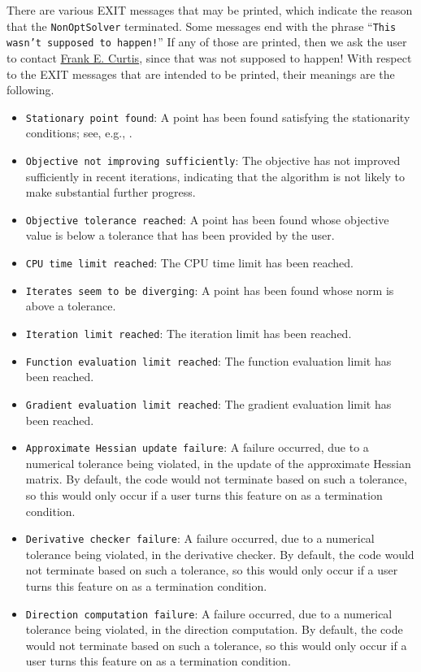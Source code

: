 \documentclass{article}
\begin{document}
There are various EXIT messages that may be printed, which indicate the reason that the \texttt{NonOptSolver} terminated.  Some messages end with the phrase ``\texttt{This wasn't supposed to happen!}''  If any of those are printed, then we ask the user to contact \href{mailto:frank.e.curtis@gmail.com}{Frank E. Curtis}, since that was not supposed to happen!  With respect to the EXIT messages that are intended to be printed, their meanings are the following.

\begin{itemize}
  \item \texttt{Stationary point found}: A point has been found satisfying the stationarity conditions; see, e.g., \cite{CurtRobiZhou20}.
  \item \texttt{Objective not improving sufficiently}: The objective has not improved sufficiently in recent iterations, indicating that the algorithm is not likely to make substantial further progress.
  \item \texttt{Objective tolerance reached}: A point has been found whose objective value is below a tolerance that has been provided by the user.
  \item \texttt{CPU time limit reached}: The CPU time limit has been reached.
  \item \texttt{Iterates seem to be diverging}: A point has been found whose norm is above a tolerance.
  \item \texttt{Iteration limit reached}: The iteration limit has been reached.
  \item \texttt{Function evaluation limit reached}: The function evaluation limit has been reached.
  \item \texttt{Gradient evaluation limit reached}:  The gradient evaluation limit has been reached.
  \item \texttt{Approximate Hessian update failure}: A failure occurred, due to a numerical tolerance being violated, in the update of the approximate Hessian matrix.  By default, the code would not terminate based on such a tolerance, so this would only occur if a user turns this feature on as a termination condition.
  \item \texttt{Derivative checker failure}: A failure occurred, due to a numerical tolerance being violated, in the derivative checker.  By default, the code would not terminate based on such a tolerance, so this would only occur if a user turns this feature on as a termination condition.
  \item \texttt{Direction computation failure}: A failure occurred, due to a numerical tolerance being violated, in the direction computation.  By default, the code would not terminate based on such a tolerance, so this would only occur if a user turns this feature on as a termination condition.

\end{itemize}
\end{document}
